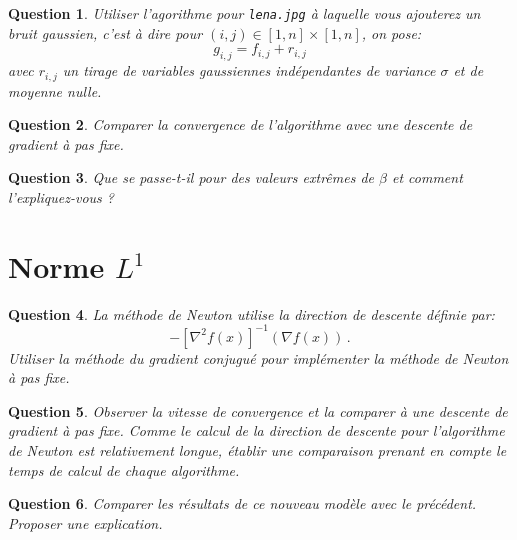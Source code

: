 \documentclass[10pt,a4paper,fleqn]{report}
\newtheorem{question}{Question}
\begin{document}
\begin{question}
Utiliser l'agorithme pour \texttt{lena.jpg} \`a laquelle vous ajouterez un bruit gaussien, c'est \`a dire pour $ (i,j)\in [1,n]\times[1,n]$, on pose:
\begin{equation}
g_{i,j} = f_{i,j} + r_{i,j}
\end{equation}
avec $r_{i,j}$ un tirage de variables gaussiennes ind\'ependantes de variance $\sigma$ et de moyenne nulle.
\end{question}

\begin{question}
Comparer la convergence de l'algorithme avec une descente de gradient \`a pas fixe.
\end{question}

\begin{question}
Que se passe-t-il pour des valeurs extrêmes de $\beta$ et comment l'expliquez-vous ?
\end{question}


\section{Norme $L^{1}$}

\begin{question}
La m\'ethode de Newton utilise la direction de descente d\'efinie par:
$$ -[\nabla^2f(x)]^{-1}(\nabla f(x))\,.$$
Utiliser la m\'ethode du gradient conjugu\'e pour impl\'ementer la m\'ethode de Newton \`a pas fixe.
\end{question}

\begin{question}
Observer la vitesse de convergence et la comparer \`a une descente de gradient \`a pas fixe.
Comme le calcul de la direction de descente pour l'algorithme de Newton est relativement longue, \'etablir une comparaison prenant en compte le temps de calcul de chaque algorithme.
\end{question}

\begin{question}
Comparer les r\'esultats de ce nouveau mod\`ele avec le pr\'ec\'edent. Proposer une explication.
\end{question}
\end{document}
